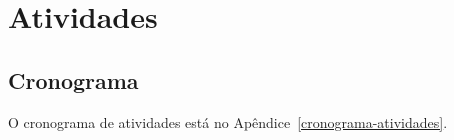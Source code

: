 
\section{Atividades}
    \label{sec:atividades}

    \subsection{Cronograma}
    	\label{subsec:cronograma}

    	O cronograma de atividades está no Apêndice~\ref{cronograma-atividades}.